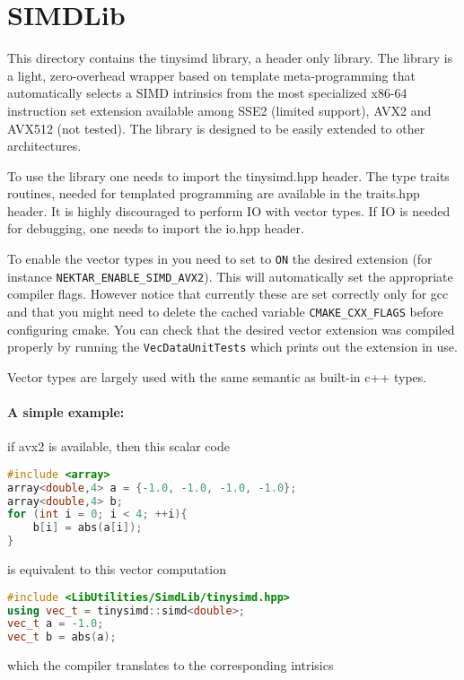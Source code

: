 %
\section{SIMDLib}

This directory contains the tinysimd library, a header only library.
The library is a light, zero-overhead wrapper based on template meta-programming that automatically selects a SIMD intrinsics from the most specialized x86-64 instruction set extension available among SSE2 (limited support), AVX2 and AVX512 (not tested).
The library is designed to be easily extended to other architectures.

To use the library one needs to import the tinysimd.hpp header.
The type traits routines, needed for templated programming are available in the traits.hpp header.
It is highly discouraged to perform IO with vector types. If IO is needed for debugging, one needs to import the io.hpp header.

To enable the vector types in {\nek} you need to set to \verb+ON+ the desired extension (for instance \verb+NEKTAR_ENABLE_SIMD_AVX2+).
This will automatically set the appropriate compiler flags. However notice that currently these are set correctly only for gcc and that you might need to delete the cached variable \verb+CMAKE_CXX_FLAGS+ before configuring cmake.
You can check that the desired vector extension was compiled properly by running the \verb+VecDataUnitTests+ which prints out the extension in use.


Vector types are largely used with the same semantic as built-in c++ types.

\paragraph{A simple example: } if avx2 is available, then this scalar code
\begin{lstlisting}[language=C++]
#include <array>
array<double,4> a = {-1.0, -1.0, -1.0, -1.0};
array<double,4> b;
for (int i = 0; i < 4; ++i){
    b[i] = abs(a[i]);
}
\end{lstlisting}

is equivalent to this vector computation

\begin{lstlisting}[language=C++]
#include <LibUtilities/SimdLib/tinysimd.hpp>
using vec_t = tinysimd::simd<double>;
vec_t a = -1.0;
vec_t b = abs(a);
\end{lstlisting}

which the compiler translates to the corresponding intrisics

